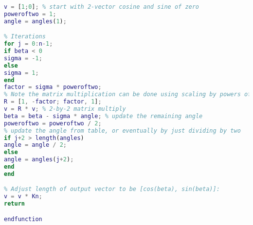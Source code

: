\begin{lstlisting}[language=Matlab]
% Initialize loop variables:
v = [1;0]; % start with 2-vector cosine and sine of zero
poweroftwo = 1;
angle = angles(1);

% Iterations
for j = 0:n-1;
if beta < 0
sigma = -1;
else
sigma = 1;
end
factor = sigma * poweroftwo;
% Note the matrix multiplication can be done using scaling by powers of two and addition subtraction
R = [1, -factor; factor, 1];
v = R * v; % 2-by-2 matrix multiply
beta = beta - sigma * angle; % update the remaining angle
poweroftwo = poweroftwo / 2;
% update the angle from table, or eventually by just dividing by two
if j+2 > length(angles)
angle = angle / 2;
else
angle = angles(j+2);
end
end

% Adjust length of output vector to be [cos(beta), sin(beta)]:
v = v * Kn;
return

endfunction
\end{lstlisting}

